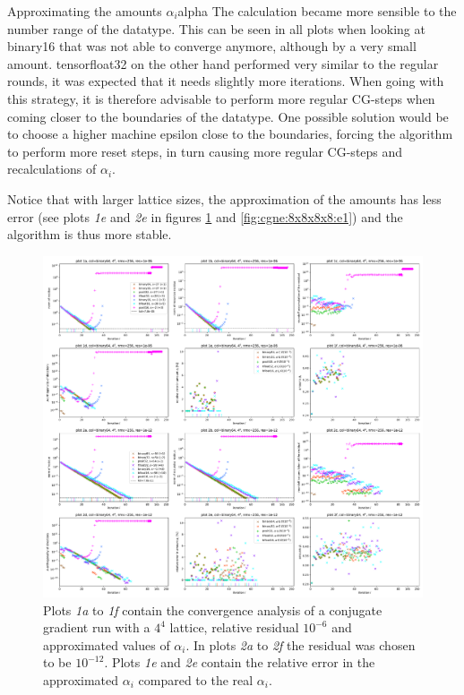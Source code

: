 \documentclass{article}
\theoremstyle{plain} %
\theoremstyle{convention} %
\theoremstyle{remark} %
\numberwithin{equation}{section}
\begin{document}
\begin{proposal}{Approximating the amounts $\alpha_i$}{alpha}
The calculation became more sensible to the number range of the datatype. This can be seen in all plots when looking at \gls{binary16} that was not able to converge anymore, although by a very small amount. \gls{tensorfloat32} on the other hand performed very similar to the regular rounds, it was expected that it needs slightly more iterations. When going with this strategy, it is therefore advisable to perform more regular CG-steps when coming closer to the boundaries of the datatype. One possible solution would be to choose a higher machine epsilon close to the boundaries, forcing the algorithm to perform more reset steps, in turn causing more regular CG-steps and recalculations of $\alpha_i$.

Notice that with larger lattice sizes, the approximation of the amounts has less error (see plots \textit{1e} and \textit{2e} in figures \ref{fig:cgne:4x4x4x4:e1} and \ref{fig:cgne:8x8x8x8:e1}) and the algorithm is thus more stable.

\end{proposal}

\begin{figure}
    \centering
    \includegraphics[width=1.0\textwidth]{plots/cgne_4x4x4x4_e1}
    \caption{Plots \textit{1a} to \textit{1f} contain the convergence analysis of a conjugate gradient run with a $4^4$ lattice, relative residual $10^{-6}$ and approximated values of $\alpha_i$. In plots \textit{2a} to \textit{2f} the residual was chosen to be $10^{-12}$. Plots \textit{1e} and \textit{2e} contain the relative error in the approximated $\alpha_i$ compared to the real $\alpha_i$.}
    \label{fig:cgne:4x4x4x4:e1}
\end{figure}
\end{document}
